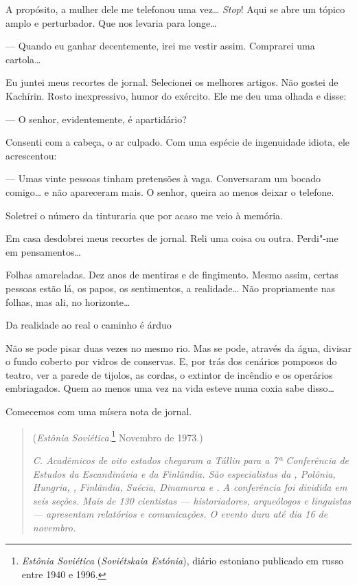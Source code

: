 A propósito, a mulher dele me telefonou uma vez\ldots{} \emph{Stop}! Aqui se
abre um tópico amplo e perturbador. Que nos levaria para longe\ldots{}

--- Quando eu ganhar decentemente, irei me vestir assim. Comprarei uma
cartola\ldots{}

Eu juntei meus recortes de jornal. Selecionei os melhores artigos. Não
gostei de Kachírin. Rosto inexpressivo, humor do exército. Ele me deu
uma olhada e disse:

--- O senhor, evidentemente, é apartidário?

Consenti com a cabeça, o ar culpado. Com uma espécie de ingenuidade
idiota, ele acrescentou:

--- Umas vinte pessoas tinham pretensões à vaga. Conversaram um bocado
comigo\ldots{} e não apareceram mais. O senhor, queira ao menos deixar o
telefone.

Soletrei o número da tinturaria que por acaso me veio à memória.

Em casa desdobrei meus recortes de jornal. Reli uma coisa ou outra.
Perdi"-me em pensamentos\ldots{}

Folhas amareladas. Dez anos de mentiras e de fingimento. Mesmo assim,
certas pessoas estão lá, os papos, os sentimentos, a realidade\ldots{} Não
propriamente nas folhas, mas ali, no horizonte\ldots{}

Da realidade ao real o caminho é árduo

Não se pode pisar duas vezes no mesmo rio. Mas se pode, através da água,
divisar o fundo coberto por vidros de conservas. E, por trás dos
cenários pomposos do teatro, ver a parede de tijolos, as cordas, o
extintor de incêndio e os operários embriagados. Quem ao menos uma vez
na vida esteve numa coxia sabe disso\ldots{}

Comecemos com uma mísera nota de jornal.

\movetooddpage
\begin{center}
{}
\end{center}


\begin{quotation}
\begin{flushright}
(\emph{Estônia Soviética}.\footnote{\emph{Estônia Soviética}
  (\emph{Soviétskaia Estónia}), diário estoniano publicado em russo
  en­tre 1940 e 1996.} Novembro de 1973.)\\
\end{flushright}
\vspace{4pt}
\noindent\emph{C. Acadêmicos de oito estados chegaram a
Tállin para a 7ª Conferência de Estudos da Escandinávia e da Finlândia.
São especialistas da , Polônia, Hungria, , Finlândia, Suécia,
Dinamarca e . A conferência foi dividida em seis seções. Mais de 130
cientistas --- historiadores, arqueólogos e linguistas --- apresentam
relatórios e comunicações. O evento dura até dia 16 de novembro.}
\end{quotation}

